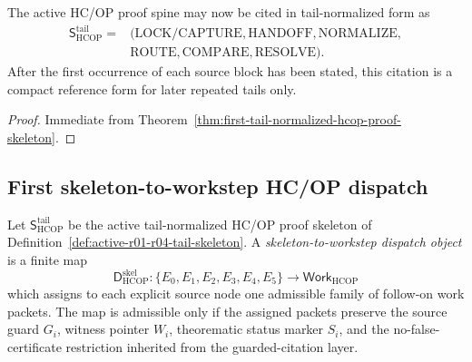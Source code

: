 \begin{corollary}
\label{cor:v3340-r14-working-rule}
The active HC/OP proof spine may now be cited in tail-normalized form as
\[
\begin{aligned}
 \mathsf S_{\mathrm{HCOP}}^{\mathrm{tail}}
 ={}& (\mathrm{LOCK/CAPTURE},\mathrm{HANDOFF},\mathrm{NORMALIZE},\\
 &\mathrm{ROUTE},\mathrm{COMPARE},\mathrm{RESOLVE}).
\end{aligned}
\]
After the first occurrence of each source block has been stated, this citation is a compact reference form for later repeated tails only.
\end{corollary}

\begin{proof}
Immediate from Theorem~\ref{thm:first-tail-normalized-hcop-proof-skeleton}.
\end{proof}


\subsection{First skeleton-to-workstep HC/OP dispatch}
\label{subsec:first-skeleton-to-workstep-hcop-dispatch}

\begin{definition}
\label{def:skeleton-to-workstep-dispatch-object}
Let \(\mathsf S_{\mathrm{HCOP}}^{\mathrm{tail}}\) be the active tail-normalized HC/OP proof skeleton of Definition~\ref{def:active-r01-r04-tail-skeleton}. A \emph{skeleton-to-workstep dispatch object} is a finite map
\[
 \mathsf D_{\mathrm{HCOP}}^{\mathrm{skel}}
 :
 \{E_0,E_1,E_2,E_3,E_4,E_5\}
 \longrightarrow
 \mathsf{Work}_{\mathrm{HCOP}}
\]
which assigns to each explicit source node one admissible family of follow-on work packets. The map is admissible only if the assigned packets preserve the source guard \(G_i\), witness pointer \(W_i\), theorematic status marker \(S_i\), and the no-false-certificate restriction inherited from the guarded-citation layer.
\end{definition}

